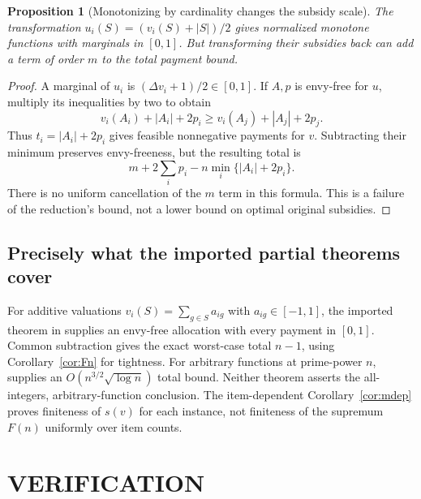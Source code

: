 \documentclass[11pt,a4paper]{article}
\newtheorem{proposition}[theorem]{Proposition}
\theoremstyle{remark}\newtheorem{remark}[theorem]{Remark}
\begin{document}
\begin{proposition}[Monotonizing by cardinality changes the subsidy scale]\label{prop:cardinality}
The transformation $u_i(S)=(v_i(S)+|S|)/2$ gives normalized monotone functions with marginals in $[0,1]$. But transforming their subsidies back can add a term of order $m$ to the total payment bound.
\end{proposition}
\begin{proof}
A marginal of $u_i$ is $(\Delta v_i+1)/2\in[0,1]$. If $A,p$ is envy-free for $u$, multiply its inequalities by two to obtain
\[
v_i(A_i)+|A_i|+2p_i\ge v_i(A_j)+|A_j|+2p_j.
\]
Thus $t_i=|A_i|+2p_i$ gives feasible nonnegative payments for $v$. Subtracting their minimum preserves envy-freeness, but the resulting total is
\[
m+2\sum_i p_i-n\min_i\{|A_i|+2p_i\}.
\]
There is no uniform cancellation of the $m$ term in this formula. This is a failure of the reduction's bound, not a lower bound on optimal original subsidies.
\end{proof}

\subsection{Precisely what the imported partial theorems cover}
For additive valuations $v_i(S)=\sum_{g\in S}a_{ig}$ with $a_{ig}\in[-1,1]$, the imported theorem in \cite{mixed} supplies an envy-free allocation with every payment in $[0,1]$. Common subtraction gives the exact worst-case total $n-1$, using Corollary~\ref{cor:Fn} for tightness. For arbitrary functions at prime-power $n$, \cite{prime} supplies an $O(n^{3/2}\sqrt{\log n})$ total bound. Neither theorem asserts the all-integers, arbitrary-function conclusion. The item-dependent Corollary~\ref{cor:mdep} proves finiteness of $s(v)$ for each instance, not finiteness of the supremum $F(n)$ uniformly over item counts.

\section{VERIFICATION}
\end{document}
